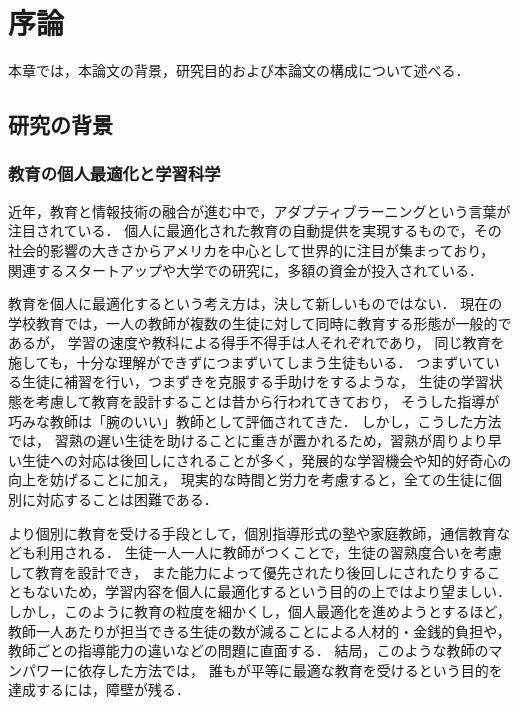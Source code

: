 \chapter{序論}
\label{chap:intro}
\fancyhf{}
\rhead{\thepage}
\cfoot{\thepage}

本章では，本論文の背景，研究目的および本論文の構成について述べる．


\section{研究の背景}

\subsection{教育の個人最適化と学習科学}
近年，教育と情報技術の融合が進む中で，アダプティブラーニングという言葉が注目されている．
個人に最適化された教育の自動提供を実現するもので，その社会的影響の大きさからアメリカを中心として世界的に注目が集まっており，
関連するスタートアップや大学での研究に，多額の資金が投入されている\cite{piccioli2014learning}．

教育を個人に最適化するという考え方は，決して新しいものではない．
現在の学校教育では，一人の教師が複数の生徒に対して同時に教育する形態が一般的であるが，
学習の速度や教科による得手不得手は人それぞれであり，
同じ教育を施しても，十分な理解ができずにつまずいてしまう生徒もいる．
つまずいている生徒に補習を行い，つまずきを克服する手助けをするような，
生徒の学習状態を考慮して教育を設計することは昔から行われてきており，
そうした指導が巧みな教師は「腕のいい」教師として評価されてきた．
しかし，こうした方法では，
習熟の遅い生徒を助けることに重きが置かれるため，習熟が周りより早い生徒への対応は後回しにされることが多く，発展的な学習機会や知的好奇心の向上を妨げることに加え，
現実的な時間と労力を考慮すると，全ての生徒に個別に対応することは困難である．

より個別に教育を受ける手段として，個別指導形式の塾や家庭教師，通信教育なども利用される．
生徒一人一人に教師がつくことで，生徒の習熟度合いを考慮して教育を設計でき，
また能力によって優先されたり後回しにされたりすることもないため，学習内容を個人に最適化するという目的の上ではより望ましい．
しかし，このように教育の粒度を細かくし，個人最適化を進めようとするほど，
教師一人あたりが担当できる生徒の数が減ることによる人材的・金銭的負担や，教師ごとの指導能力の違いなどの問題に直面する．
結局，このような教師のマンパワーに依存した方法では，
誰もが平等に最適な教育を受けるという目的を達成するには，障壁が残る．

